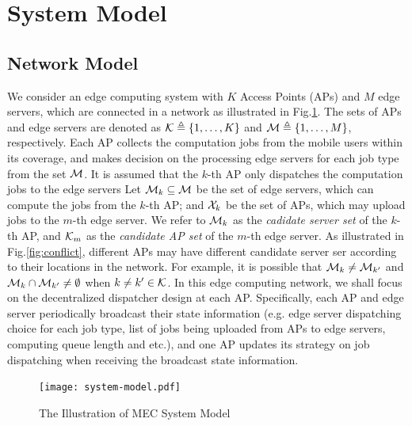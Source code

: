 \section{System Model}
\subsection{Network Model}
We consider an edge computing system with $K$ Access Points (APs) and $M$ edge servers, which are connected in a network as illustrated in Fig.\ref{fig:system}.
The sets of APs and edge servers are denoted as $\mathcal{K} \triangleq \{1,\dots,K\}$ and $\mathcal{M} \triangleq \{1,\dots,M\}$, respectively.
Each AP collects the computation jobs from the mobile users within its coverage, and makes decision on the processing edge servers for each job type from the set $\mathcal{M}$.
It is assumed that the $k$-th AP only dispatches the computation jobs to the edge servers 
Let $\mathcal{M}_{k} \subseteq \mathcal{M}$ be the set of edge servers, which can compute the jobs from the $k$-th AP;
and $\mathcal{X}_{k}$ be the set of APs, which may upload jobs to the $m$-th edge server.
We refer to $\mathcal{M}_{k}$ as the \emph{cadidate server set} of the $k$-th AP, and $\mathcal{K}_{m}$ as the \emph{candidate AP set} of the $m$-th edge server.
As illustrated in Fig.\ref{fig:conflict}, different APs may have different candidate server ser according to their locations in the network.
For example, it is possible that $\mathcal{M}_{k} \neq \mathcal{M}_{k'}$ and $\mathcal{M}_{k} \cap \mathcal{M}_{k'} \neq \emptyset$ when $k \neq k' \in \mathcal{K}$.
In this edge computing network, we shall focus on the decentralized dispatcher design at each AP.
Specifically, each AP and edge server periodically broadcast their state information (e.g. edge server dispatching choice for each job type, list of jobs being uploaded from APs to edge servers, computing queue length and etc.), and one AP updates its strategy on job dispatching when receiving the broadcast state information.

\begin{figure}[ht]
    \centering
    \texttt{[image: system-model.pdf]}
    \caption{The Illustration of MEC System Model}
    \label{fig:system}
\end{figure}

